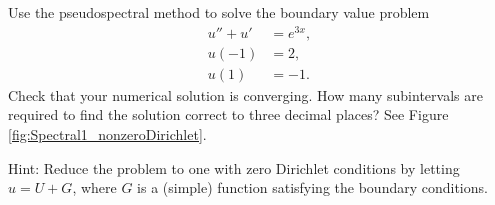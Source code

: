\begin{problem}
Use the pseudospectral method to solve the boundary value problem 
\begin{align*}
u'' + u' &= e^{3x}, \\
u(-1) &= 2, \\
u(1) &= -1.
\end{align*}
Check that your numerical solution is converging.
How many subintervals are required to find the solution correct to three decimal places?
See Figure \ref{fig:Spectral1_nonzeroDirichlet}.
	
Hint: Reduce the problem to one with zero Dirichlet conditions by letting $u = U+G$, where $G$ is a (simple) function satisfying the boundary conditions.
\end{problem}

